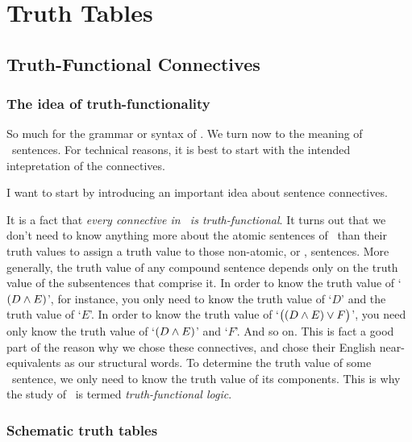 \part{Truth Tables}
\label{ch.TruthTables}

 


\chapter{Truth-Functional Connectives}\label{s:TruthFunctionality}

\section{The idea of truth-functionality}
So much for the grammar or syntax of \TFL. We turn now to the meaning of \TFL\ sentences. For technical reasons, it is best to  start with the intended intepretation of the connectives. 

I want to start by introducing an important idea about sentence connectives.

It is a fact that \emph{every connective in \TFL\ is truth-functional}. It turns out that we don't need to know anything more about the atomic sentences of \TFL\ than their truth values to assign a truth value to those non-atomic, or , sentences. More generally, the truth value of any compound sentence depends only on the truth value of the subsentences that comprise it. In order to know the truth value of `$(D \wedge E)$', for instance, you only need to know the truth value of `$D$' and the truth value of `$E$'. In order to know the truth value of `$\bigl( (D \wedge E) \vee F\bigr)$', you need only know the truth value of `$(D \wedge E)$' and `$F$'. And so on. This is fact a good part of the reason why we chose these connectives, and chose their English near-equivalents as our structural words. To determine the truth value of some \TFL\ sentence, we only need to know the truth value of its components. This is why the study of \TFL\ is termed \emph{truth-functional logic}.

\section{Schematic truth tables}\label{s:SchematicTruthTables}

